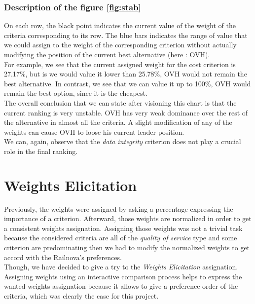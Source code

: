 \documentclass[a4paper,11pt]{article}
\begin{document}
\subsubsection*{Description of the figure \ref{fig:stab}}

On each row, the black point indicates the current value of the weight of the criteria corresponding to its row. The blue bars indicates the range of value that we could assign to the weight of the corresponding criterion without actually modifying the position of the current best alternative (here : OVH).\\

For example, we see that the current assigned weight for the cost criterion is 27.17\%, but is we would value it lower than 25.78\%, OVH would not remain the best alternative. In contrast, we see that we can value it up to 100\%, OVH would remain the best option, since it is the cheapest.\\

The overall conclusion that we can state after visioning this chart is that the current ranking is very unstable. OVH has very weak dominance over the rest of the alternative in almost all the criteria. A slight modification of any of the weights can cause OVH to loose his current leader position.\\

We can, again, observe that the \textit{data integrity} criterion does not play a crucial role in the final ranking.

\section{Weights Elicitation}
Previously, the weights were assigned by asking a percentage expressing the importance of a criterion. Afterward, those weights are normalized in order to get a consistent weights assignation. Assigning those weights was not a trivial task because the considered criteria are all of the \emph{quality of service} type and some criterion are predominating then we had to modify the normalized weights to get accord with the Railnova's preferences.\\

Though, we have decided to give a try to the \emph{Weights Elicitation} assignation. Assigning weights using an interactive comparison process helps to express the wanted weights assignation because it allows to give a preference order of the criteria, which was clearly the case for this project.
\end{document}
